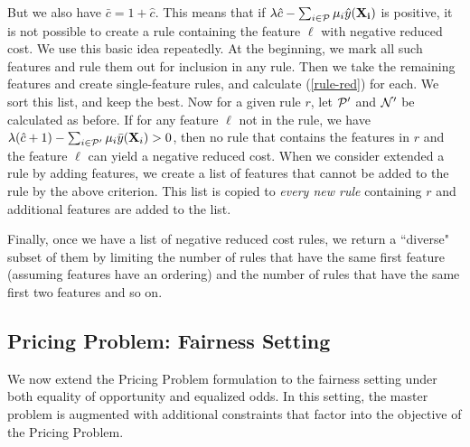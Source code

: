 \documentclass[twoside,11pt]{article}
\begin{document}
But we also have $\bar c = 1+ \hat c$. This means that if $\lambda \hat c - \sum_{i \in \cal P} \mu_i\hat y({\bf X_i})$ is positive, it is not possible to create a rule containing the feature $\ell$ with negative reduced cost. We use this basic idea repeatedly.
At the beginning, we mark all such features and rule them out for inclusion in any rule. Then we take the remaining features and create single-feature rules, and calculate (\ref{rule-red}) for each. We sort this list, and keep the best.
Now for a given rule $r$, let $\cal P'$ and $\cal N'$ be calculated as before. If for any feature $\ell$ not in the rule, we have $\lambda (\hat c + 1) - \sum_{i \in \cal P'}\mu_i \bar y({\bf X}_i) > 0$, then no rule that contains the features in $r$ and the feature $\ell$ can yield a negative reduced cost. When we consider extended a rule by adding features, we create a list of features that cannot be added to the rule by the above criterion. This list is copied to {\em every new rule} containing $r$ and additional features are added to the list.

Finally, once we have a list of negative reduced cost rules, we return a ``diverse" subset of them by limiting the number of rules that have the same first feature (assuming features have an ordering) and the number of rules that have the same first two features and so on. 


\subsection{Pricing Problem: Fairness Setting} 
We now extend the Pricing Problem formulation to the fairness setting under both equality of opportunity and equalized odds. In this setting, the master problem is augmented with additional constraints that factor into the objective of the Pricing Problem.
\end{document}
